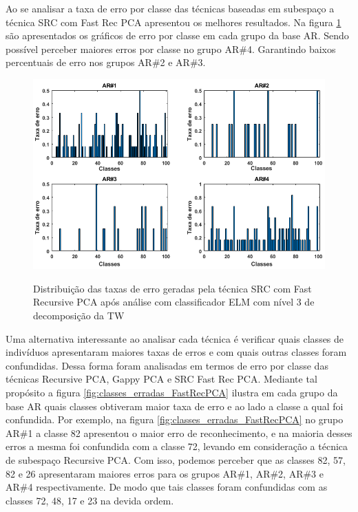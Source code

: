 Ao se analisar a taxa de erro por classe das técnicas baseadas em subespaço a técnica SRC com Fast Rec PCA   apresentou os melhores resultados. Na figura \ref{fig:taxa_erro_SRC_Fast_rec_PCA} são apresentados os gráficos de erro por classe em cada grupo da base AR. Sendo possível perceber maiores erros por classe no grupo AR\#4. Garantindo baixos percentuais de erro nos grupos AR\#2 e AR\#3.


\begin{figure}[H]
\centering
\caption{Distribuição das taxas de erro geradas pela técnica SRC com Fast Recursive PCA após análise com classificador ELM com nível 3 de decomposição da TW}
\includegraphics[scale=0.60]{imgs4/erro_por_classe_SRC_Fast_rec_PCA}
\label{fig:taxa_erro_SRC_Fast_rec_PCA}
\end{figure}




Uma alternativa interessante ao analisar cada técnica é verificar quais classes de indivíduos apresentaram maiores taxas de erros e com quais outras classes foram confundidas. Dessa forma foram analisadas em termos de erro por classe das técnicas Recursive PCA, Gappy PCA e SRC Fast Rec PCA. Mediante tal propósito a figura \ref{fig:classes_erradas_FastRecPCA} ilustra em cada grupo da base AR quais classes obtiveram maior taxa de erro e ao lado a classe a qual foi confundida. Por exemplo, na figura \ref{fig:classes_erradas_FastRecPCA} no grupo AR\#1 a classe 82 apresentou o maior erro de reconhecimento, e na maioria desses erros a mesma foi confundida com a classe 72, levando em consideração a técnica de subespaço Recursive PCA.  Com isso, podemos perceber que as classes 82, 57, 82 e 26 apresentaram maiores erros para os grupos AR\#1, AR\#2, AR\#3 e AR\#4 respectivamente. De modo que tais classes foram confundidas com as classes 72, 48, 17 e 23 na devida ordem.


